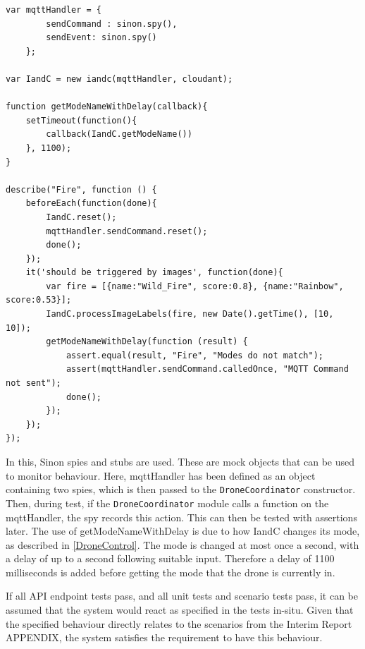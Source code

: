 \documentclass{article}
\begin{document}
\begin{lstlisting}
var mqttHandler = {
        sendCommand : sinon.spy(),
        sendEvent: sinon.spy()
    };
	
var IandC = new iandc(mqttHandler, cloudant);

function getModeNameWithDelay(callback){
	setTimeout(function(){
		callback(IandC.getModeName())
	}, 1100);
}

describe("Fire", function () {
	beforeEach(function(done){
		IandC.reset();
		mqttHandler.sendCommand.reset();
		done();
	});
	it('should be triggered by images', function(done){
		var fire = [{name:"Wild_Fire", score:0.8}, {name:"Rainbow", score:0.53}];
		IandC.processImageLabels(fire, new Date().getTime(), [10, 10]);
		getModeNameWithDelay(function (result) {
			assert.equal(result, "Fire", "Modes do not match");
			assert(mqttHandler.sendCommand.calledOnce, "MQTT Command not sent");
			done();
		});
	});
});
\end{lstlisting} 

In this, Sinon spies and stubs are used\cite{sinon}. These are mock objects that can be used to monitor behaviour. Here, mqttHandler has been defined as an object containing two spies, which is then passed to the \texttt{DroneCoordinator} constructor. Then, during test, if the \texttt{DroneCoordinator} module calls a function on the mqttHandler, the spy records this action. This can then be tested with assertions later. The use of getModeNameWithDelay is due to how IandC changes its mode, as described in \ref{DroneControl}. The mode is changed at most once a second, with a delay of up to a second following suitable input. Therefore a delay of 1100 milliseconds is added before getting the mode that the drone is currently in.

If all API endpoint tests pass, and all unit tests and scenario tests pass, it can be assumed that the system would react as specified in the tests in-situ. Given that the specified behaviour directly relates to the scenarios from the Interim Report APPENDIX, the system satisfies the requirement to have this behaviour. 
\end{document}
